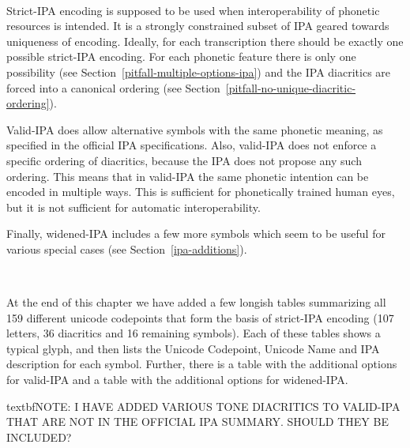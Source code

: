 \ 

\noindent Strict-IPA encoding is supposed to be used when interoperability of
phonetic resources is intended. It is a strongly constrained subset of IPA
geared towards uniqueness of encoding. Ideally, for each transcription there
should be exactly one possible strict-IPA encoding. For each phonetic feature
there is only one possibility (see Section~\ref{pitfall-multiple-options-ipa})
and the IPA diacritics are forced into a canonical ordering (see
Section~\ref{pitfall-no-unique-diacritic-ordering}).

Valid-IPA does allow alternative symbols with the same phonetic meaning, as 
specified in the official IPA specifications. Also, valid-IPA does not enforce a 
specific ordering of diacritics, because the IPA does not propose any such 
ordering. This means that in valid-IPA the same phonetic intention can be 
encoded in multiple ways. This is sufficient for phonetically trained human 
eyes, but it is not sufficient for automatic interoperability.

Finally, widened-IPA includes a few more symbols which seem to be useful for
various special cases (see Section~\ref{ipa-additions}).

\ 

\noindent At the end of this chapter we have added a few longish tables summarizing all
159 different unicode codepoints that form the basis of strict-IPA encoding
(107 letters, 36 diacritics and 16 remaining symbols). Each of
these tables shows a typical glyph, and then lists the Unicode Codepoint,
Unicode Name and IPA description for each symbol. Further, there is a table with 
the additional options for valid-IPA and a table with the additional options for 
widened-IPA.\@

textbf{NOTE: I HAVE ADDED VARIOUS TONE DIACRITICS TO VALID-IPA THAT ARE NOT IN
THE OFFICIAL IPA SUMMARY. SHOULD THEY BE INCLUDED?}

